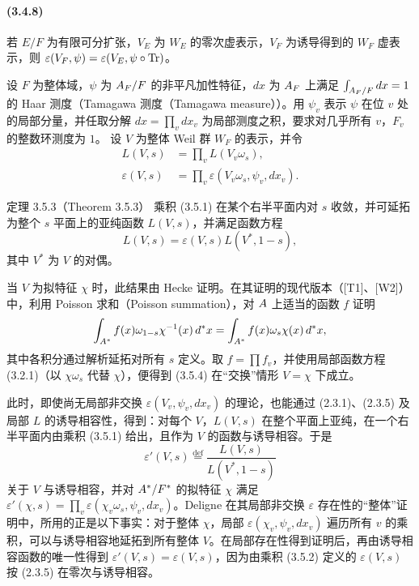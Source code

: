 \paragraph*{(3.4.8)} 若 $E/F$ 为有限可分扩张，$V_E$ 为 $W_E$ 的零次虚表示，$V_F$ 为诱导得到的 $W_F$ 虚表示，则 $\varepsilon(V_F,\psi)=\varepsilon(V_E,\psi\circ\operatorname{Tr})$。

设 $F$ 为整体域，$\psi$ 为 $A_F/F$ 的非平凡加性特征，$dx$ 为 $A_F$ 上满足 $\int_{A_F/F}dx=1$ 的 Haar 测度（Tamagawa 测度（Tamagawa measure））。用 $\psi_v$ 表示 $\psi$ 在位 $v$ 处的局部分量，并任取分解 $dx=\prod_v dx_v$ 为局部测度之积，要求对几乎所有 $v$，$F_v$ 的整数环测度为 $1$。
设 $V$ 为整体 Weil 群 $W_F$ 的表示，并令
\begin{align}
 L(V,s)&=\prod_v L(V_v\omega_s),\tag{3.5.1}\\
 \varepsilon(V,s)&=\prod_v\varepsilon(V_v\omega_s,\psi_v,dx_v).\tag{3.5.2}
\end{align}
\begin{originaltheorem}{定理 3.5.3（Theorem 3.5.3）}
乘积 (3.5.1) 在某个右半平面内对 $s$ 收敛，并可延拓为整个 $s$ 平面上的亚纯函数 $L(V,s)$，并满足函数方程
\begin{equation}
 L(V,s)=\varepsilon(V,s)L(V^*,1-s),\tag{3.5.4}
\end{equation}
其中 $V^*$ 为 $V$ 的对偶。
\end{originaltheorem}
当 $V$ 为拟特征 $\chi$ 时，此结果由 Hecke 证明。在其证明的现代版本（[T1]、[W2]）中，利用 Poisson 求和（Poisson summation），对 $A$ 上适当的函数 $f$ 证明
\[
 \int_{A^*}f(x)\omega_{1-s}\chi^{-1}(x)\,d^*x
 =\int_{A^*}f(x)\omega_s\chi(x)\,d^*x,
\]
其中各积分通过解析延拓对所有 $s$ 定义。取 $f=\prod f_v$，并使用局部函数方程 (3.2.1)（以 $\chi\omega_s$ 代替 $\chi$），便得到 (3.5.4) 在“交换”情形 $V=\chi$ 下成立。

此时，即使尚无局部非交换 $\varepsilon(V_v,\psi_v,dx_v)$ 的理论，也能通过 (2.3.1)、(2.3.5) 及局部 $L$ 的诱导相容性，得到：对每个 $V$，$L(V,s)$ 在整个平面上亚纯，在一个右半平面内由乘积 (3.5.1) 给出，且作为 $V$ 的函数与诱导相容。于是
\[
 \varepsilon'(V,s)\overset{\mathrm{def}}=\frac{L(V,s)}{L(V^*,1-s)}
\]
关于 $V$ 与诱导相容，并对 $A^*/F^*$ 的拟特征 $\chi$ 满足 $\varepsilon'(\chi,s)=\prod_v\varepsilon(\chi_v\omega_s,\psi_v,dx_v)$。Deligne 在其局部非交换 $\varepsilon$ 存在性的“整体”证明中，所用的正是以下事实：对于整体 $\chi$，局部 $\varepsilon(\chi_v,\psi_v,dx_v)$ 遍历所有 $v$ 的乘积，可以与诱导相容地延拓到所有整体 $V$。在局部存在性得到证明后，再由诱导相容函数的唯一性得到 $\varepsilon'(V,s)=\varepsilon(V,s)$，因为由乘积 (3.5.2) 定义的 $\varepsilon(V,s)$ 按 (2.3.5) 在零次与诱导相容。

